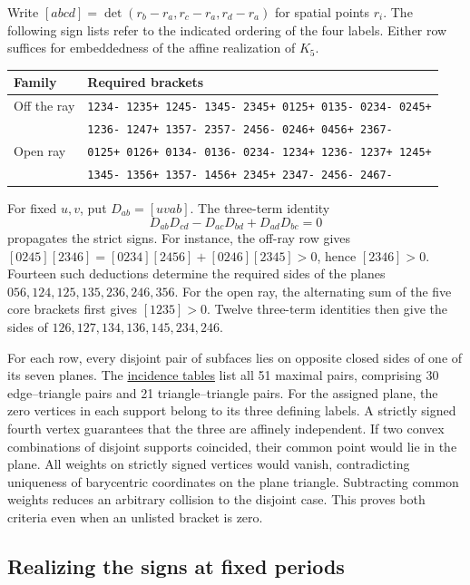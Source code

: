 \documentclass[11pt,letterpaper]{amsart}
\newcommand{\release}{bd3a0e03908481d738df30233cf95c641a1d3f71}
\newcommand{\reporef}[2]{\href{https://github.com/vltanh/lean4-origami-torus/blob/\release/#1}{#2}}
\begin{document}
Write \([abcd]=\det(r_b-r_a,r_c-r_a,r_d-r_a)\) for spatial points
\(r_i\). The following sign lists refer to the indicated ordering of
the four labels. Either row suffices for embeddedness of the affine
realization of \(K_5\).
\begin{center}
\small
\begin{tabular}{@{}ll@{}}
\toprule
Family & Required brackets\\
\midrule
Off the ray & \texttt{1234- 1235+ 1245- 1345- 2345+ 0125+ 0135- 0234- 0245+}\\
            & \texttt{1236- 1247+ 1357- 2357- 2456- 0246+ 0456+ 2367-}\\[2pt]
Open ray    & \texttt{0125+ 0126+ 0134- 0136- 0234- 1234+ 1236- 1237+ 1245+}\\
            & \texttt{1345- 1356+ 1357- 1456+ 2345+ 2347- 2456- 2467-}\\
\bottomrule
\end{tabular}
\end{center}

For fixed \(u,v\), put \(D_{ab}=[uvab]\). The three-term identity
\[
 D_{ab}D_{cd}-D_{ac}D_{bd}+D_{ad}D_{bc}=0
\]
propagates the strict signs. For instance, the off-ray row gives
\([0245][2346]=[0234][2456]+[0246][2345]>0\), hence \([2346]>0\).
Fourteen such deductions determine the required sides of the planes
\(056,124,125,135,236,246,356\). For the open ray, the alternating sum
of the five core brackets first gives \([1235]>0\). Twelve three-term
identities then give the sides of \(126,127,134,136,145,234,246\).

For each row, every disjoint pair of subfaces lies on opposite closed
sides of one of its seven planes. The
\reporef{docs/EightVertex/Type5HandProof.md}{incidence tables}
list all 51 maximal pairs, comprising 30 edge--triangle pairs and
21 triangle--triangle pairs. For the assigned plane, the zero
vertices in each support belong to its three defining labels.
A strictly signed fourth vertex guarantees that the three are
affinely independent. If two convex combinations of disjoint supports
coincided, their common point would lie in the plane. All weights on
strictly signed vertices would vanish, contradicting uniqueness of
barycentric coordinates on the plane triangle. Subtracting common
weights reduces an arbitrary collision to the disjoint case.
This proves both criteria even when an unlisted bracket is zero.

\subsection*{Realizing the signs at fixed periods}
\end{document}
